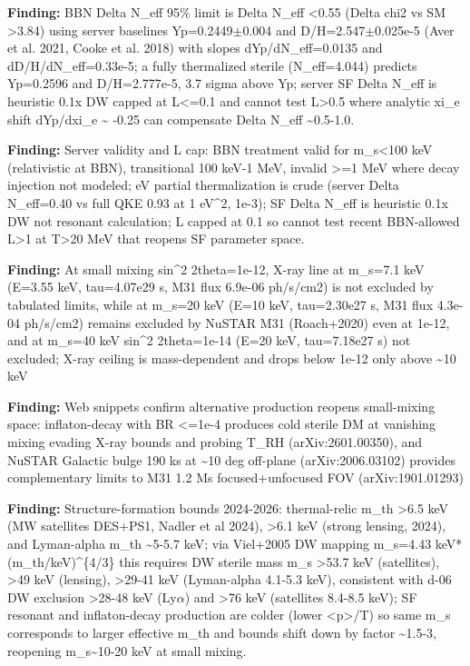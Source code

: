 \documentclass[11pt,a4paper]{article}
\begin{document}
\textbf{Finding:} BBN Delta N\_eff 95\% limit is Delta N\_eff \textless{}0.55 (Delta chi2 vs SM \textgreater{}3.84) using server baselines Yp=0.2449$\pm$0.004 and D/H=2.547$\pm$0.025e-5 (Aver et al. 2021, Cooke et al. 2018) with slopes dYp/dN\_eff=0.0135 and dD/H/dN\_eff=0.33e-5; a fully thermalized sterile (N\_eff=4.044) predicts Yp=0.2596 and D/H=2.777e-5, 3.7 sigma above Yp; server SF Delta N\_eff is heuristic 0.1x DW capped at L\textless{}=0.1 and cannot test L\textgreater{}0.5 where analytic xi\_e shift dYp/dxi\_e \textasciitilde{} -0.25 can compensate Delta N\_eff \textasciitilde{}0.5-1.0.

\textbf{Finding:} Server validity and L cap: BBN treatment valid for m\_s\textless{}100 keV (relativistic at BBN), transitional 100 keV-1 MeV, invalid \textgreater{}=1 MeV where decay injection not modeled; eV partial thermalization is crude (server Delta N\_eff=0.40 vs full QKE 0.93 at 1 eV\textasciicircum{}2, 1e-3); SF Delta N\_eff is heuristic 0.1x DW not resonant calculation; L capped at 0.1 so cannot test recent BBN-allowed L\textgreater{}1 at T\textgreater{}20 MeV that reopens SF parameter space.

\textbf{Finding:} At small mixing sin\textasciicircum{}2 2theta=1e-12, X-ray line at m\_s=7.1 keV (E=3.55 keV, tau=4.07e29 s, M31 flux 6.9e-06 ph/s/cm2) is not excluded by tabulated limits, while at m\_s=20 keV (E=10 keV, tau=2.30e27 s, M31 flux 4.3e-04 ph/s/cm2) remains excluded by NuSTAR M31 (Roach+2020) even at 1e-12, and at m\_s=40 keV sin\textasciicircum{}2 2theta=1e-14 (E=20 keV, tau=7.18e27 s) not excluded; X-ray ceiling is mass-dependent and drops below 1e-12 only above \textasciitilde{}10 keV

\textbf{Finding:} Web snippets confirm alternative production reopens small-mixing space: inflaton-decay with BR \textless{}=1e-4 produces cold sterile DM at vanishing mixing evading X-ray bounds and probing T\_RH (arXiv:2601.00350), and NuSTAR Galactic bulge 190 ks at \textasciitilde{}10 deg off-plane (arXiv:2006.03102) provides complementary limits to M31 1.2 Ms focused+unfocused FOV (arXiv:1901.01293)

\textbf{Finding:} Structure-formation bounds 2024-2026: thermal-relic m\_th \textgreater{}6.5 keV (MW satellites DES+PS1, Nadler et al 2024), \textgreater{}6.1 keV (strong lensing, 2024), and Lyman-alpha m\_th \textasciitilde{}5-5.7 keV; via Viel+2005 DW mapping m\_s=4.43 keV*(m\_th/keV)\textasciicircum{}\{4/3\} this requires DW sterile mass m\_s \textgreater{}53.7 keV (satellites), \textgreater{}49 keV (lensing), \textgreater{}29-41 keV (Lyman-alpha 4.1-5.3 keV), consistent with d-06 DW exclusion \textgreater{}28-48 keV (Ly$\alpha$) and \textgreater{}76 keV (satellites 8.4-8.5 keV); SF resonant and inflaton-decay production are colder (lower \textless{}p\textgreater{}/T) so same m\_s corresponds to larger effective m\_th and bounds shift down by factor \textasciitilde{}1.5-3, reopening m\_s\textasciitilde{}10-20 keV at small mixing.
\end{document}
